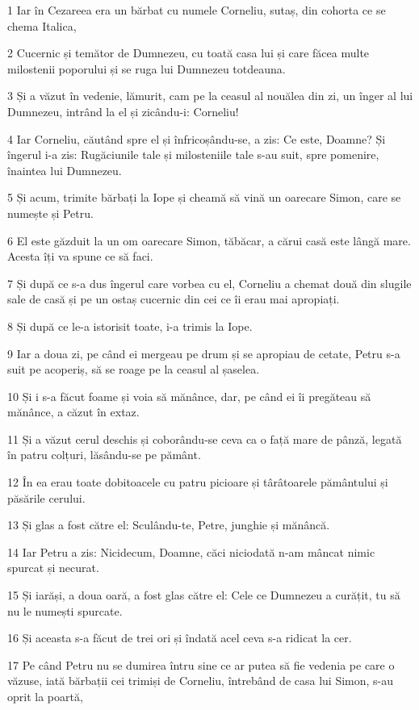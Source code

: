 \par 1 Iar în Cezareea era un bărbat cu numele Corneliu, sutaș, din cohorta ce se chema Italica,
\par 2 Cucernic și temător de Dumnezeu, cu toată casa lui și care făcea multe milostenii poporului și se ruga lui Dumnezeu totdeauna.
\par 3 Și a văzut în vedenie, lămurit, cam pe la ceasul al nouălea din zi, un înger al lui Dumnezeu, intrând la el și zicându-i: Corneliu!
\par 4 Iar Corneliu, căutând spre el și înfricoșându-se, a zis: Ce este, Doamne? Și îngerul i-a zis: Rugăciunile tale și milosteniile tale s-au suit, spre pomenire, înaintea lui Dumnezeu.
\par 5 Și acum, trimite bărbați la Iope și cheamă să vină un oarecare Simon, care se numește și Petru.
\par 6 El este găzduit la un om oarecare Simon, tăbăcar, a cărui casă este lângă mare. Acesta îți va spune ce să faci.
\par 7 Și după ce s-a dus îngerul care vorbea cu el, Corneliu a chemat două din slugile sale de casă și pe un ostaș cucernic din cei ce îi erau mai apropiați.
\par 8 Și după ce le-a istorisit toate, i-a trimis la Iope.
\par 9 Iar a doua zi, pe când ei mergeau pe drum și se apropiau de cetate, Petru s-a suit pe acoperiș, să se roage pe la ceasul al șaselea.
\par 10 Și i s-a făcut foame și voia să mănânce, dar, pe când ei îi pregăteau să mănânce, a căzut în extaz.
\par 11 Și a văzut cerul deschis și coborându-se ceva ca o față mare de pânză, legată în patru colțuri, lăsându-se pe pământ.
\par 12 În ea erau toate dobitoacele cu patru picioare și târâtoarele pământului și păsările cerului.
\par 13 Și glas a fost către el: Sculându-te, Petre, junghie și mănâncă.
\par 14 Iar Petru a zis: Nicidecum, Doamne, căci niciodată n-am mâncat nimic spurcat și necurat.
\par 15 Și iarăși, a doua oară, a fost glas către el: Cele ce Dumnezeu a curățit, tu să nu le numești spurcate.
\par 16 Și aceasta s-a făcut de trei ori și îndată acel ceva s-a ridicat la cer.
\par 17 Pe când Petru nu se dumirea întru sine ce ar putea să fie vedenia pe care o văzuse, iată bărbații cei trimiși de Corneliu, întrebând de casa lui Simon, s-au oprit la poartă,

